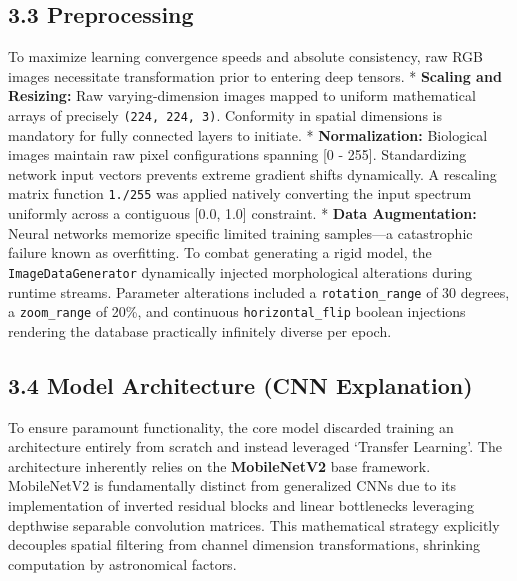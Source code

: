\documentclass[
]{article}
\begin{document}
\subsection{3.3 Preprocessing}\label{preprocessing}

To maximize learning convergence speeds and absolute consistency, raw
RGB images necessitate transformation prior to entering deep tensors. *
\textbf{Scaling and Resizing:} Raw varying-dimension images mapped to
uniform mathematical arrays of precisely \texttt{(224,\ 224,\ 3)}.
Conformity in spatial dimensions is mandatory for fully connected layers
to initiate. * \textbf{Normalization:} Biological images maintain raw
pixel configurations spanning {[}0 - 255{]}. Standardizing network input
vectors prevents extreme gradient shifts dynamically. A rescaling matrix
function \texttt{1./255} was applied natively converting the input
spectrum uniformly across a contiguous {[}0.0, 1.0{]} constraint. *
\textbf{Data Augmentation:} Neural networks memorize specific limited
training samples---a catastrophic failure known as overfitting. To
combat generating a rigid model, the \texttt{ImageDataGenerator}
dynamically injected morphological alterations during runtime streams.
Parameter alterations included a \texttt{rotation\_range} of 30 degrees,
a \texttt{zoom\_range} of 20\%, and continuous \texttt{horizontal\_flip}
boolean injections rendering the database practically infinitely diverse
per epoch.

\subsection{3.4 Model Architecture (CNN
Explanation)}\label{model-architecture-cnn-explanation}

To ensure paramount functionality, the core model discarded training an
architecture entirely from scratch and instead leveraged `Transfer
Learning'. The architecture inherently relies on the
\textbf{MobileNetV2} base framework. MobileNetV2 is fundamentally
distinct from generalized CNNs due to its implementation of inverted
residual blocks and linear bottlenecks leveraging depthwise separable
convolution matrices. This mathematical strategy explicitly decouples
spatial filtering from channel dimension transformations, shrinking
computation by astronomical factors.
\end{document}
